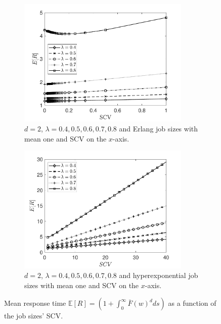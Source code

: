 \documentclass[12pt]{report}
\newcommand{\E}{\mathbb{E}}
\begin{document}
\begin{figure}[t]
\begin{subfigure}{.45\textwidth}
\begin{center}
\includegraphics[width=0.9\textwidth]{figures/Chapter3/plot_MRT_Erlang_identical_difflam.pdf}
\caption{$d=2$, $\lambda=0.4,0.5,0.6,0.7,0.8$ and Erlang job sizes with mean one and SCV on the $x$-axis.}
\label{fig:MRT_ifo_SCV_difflam_Erlangs}
\end{center}
\end{subfigure}
\begin{subfigure}{.45\textwidth}
\begin{center}
\includegraphics[width=0.9\textwidth]{figures/Chapter3/plot_ifo_SCV_Redid_HExp.pdf}
\caption{$d=2$, $\lambda=0.4,0.5,0.6,0.7,0.8$ and hyperexponential job sizes with mean one and SCV on the $x$-axis.}
\label{fig:MRT_ifo_SCV_difflam_HExp}
\end{center}
\end{subfigure}
\caption{Mean response time $\E[R] =\left(1+\int_0^\infty \bar{F}(w)^d ds\right)$ as a function of the job sizes' SCV.}
\label{fig:MRT_ifo_SCV_difflam}
\end{figure}
\end{document}
